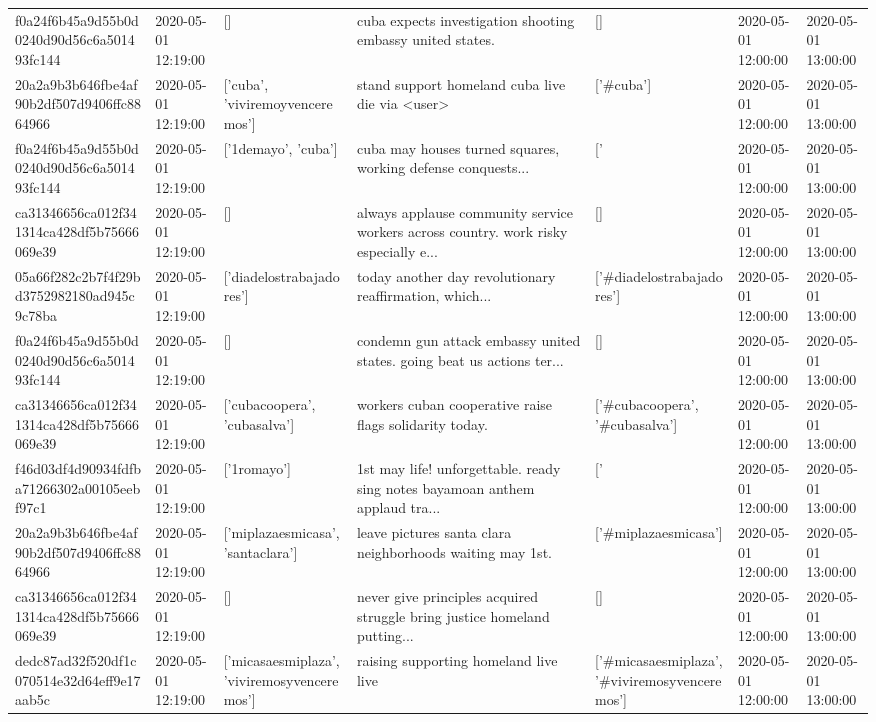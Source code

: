 \begin{tabular}{lllllll}
f0a24f6b45a9d55b0d0240d90d56c6a501493fc144 & 2020-05-01 12:19:00 & [] & cuba expects investigation shooting embassy united states. & [] & 2020-05-01 12:00:00 & 2020-05-01 13:00:00 \\
20a2a9b3b646fbe4af90b2df507d9406ffc8864966 & 2020-05-01 12:19:00 & ['cuba', 'viviremoyvenceremos'] & stand support homeland cuba live die via <user> & ['#cuba'] & 2020-05-01 12:00:00 & 2020-05-01 13:00:00 \\
f0a24f6b45a9d55b0d0240d90d56c6a501493fc144 & 2020-05-01 12:19:00 & ['1demayo', 'cuba'] & cuba may houses turned squares, working defense conquests... & ['#1demayo', '#cuba'] & 2020-05-01 12:00:00 & 2020-05-01 13:00:00 \\
ca31346656ca012f341314ca428df5b75666069e39 & 2020-05-01 12:19:00 & [] & always applause community service workers across country. work risky especially e... & [] & 2020-05-01 12:00:00 & 2020-05-01 13:00:00 \\
05a66f282c2b7f4f29bd3752982180ad945c9c78ba & 2020-05-01 12:19:00 & ['diadelostrabajadores'] & today another day revolutionary reaffirmation, which... & ['#diadelostrabajadores'] & 2020-05-01 12:00:00 & 2020-05-01 13:00:00 \\
f0a24f6b45a9d55b0d0240d90d56c6a501493fc144 & 2020-05-01 12:19:00 & [] & condemn gun attack embassy united states. going beat us actions ter... & [] & 2020-05-01 12:00:00 & 2020-05-01 13:00:00 \\
ca31346656ca012f341314ca428df5b75666069e39 & 2020-05-01 12:19:00 & ['cubacoopera', 'cubasalva'] & workers cuban cooperative raise flags solidarity today. & ['#cubacoopera', '#cubasalva'] & 2020-05-01 12:00:00 & 2020-05-01 13:00:00 \\
f46d03df4d90934fdfba71266302a00105eebf97c1 & 2020-05-01 12:19:00 & ['1romayo'] & 1st may life! unforgettable. ready sing notes bayamoan anthem applaud tra... & ['#1romayo'] & 2020-05-01 12:00:00 & 2020-05-01 13:00:00 \\
20a2a9b3b646fbe4af90b2df507d9406ffc8864966 & 2020-05-01 12:19:00 & ['miplazaesmicasa', 'santaclara'] & leave pictures santa clara neighborhoods waiting may 1st. & ['#miplazaesmicasa'] & 2020-05-01 12:00:00 & 2020-05-01 13:00:00 \\
ca31346656ca012f341314ca428df5b75666069e39 & 2020-05-01 12:19:00 & [] & never give principles acquired struggle bring justice homeland putting... & [] & 2020-05-01 12:00:00 & 2020-05-01 13:00:00 \\
dedc87ad32f520df1c070514e32d64eff9e17aab5c & 2020-05-01 12:19:00 & ['micasaesmiplaza', 'viviremosyvenceremos'] & raising supporting homeland live live & ['#micasaesmiplaza', '#viviremosyvenceremos'] & 2020-05-01 12:00:00 & 2020-05-01 13:00:00 \\

\end{tabular}
